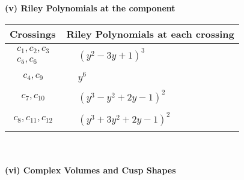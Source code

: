 \documentclass[1p]{elsarticle_modified}
\theoremstyle{definition}
\begin{document}
\newpage\renewcommand{\arraystretch}{1}
\flushleft \textbf{(v) Riley Polynomials at the component}\newline \\
\begin{tabular}{m{50pt}|m{274pt}}
Crossings & \hspace{64pt}Riley Polynomials at each crossing \\
\hline $$\begin{aligned}c_{1},c_{2},c_{3}\\c_{5},c_{6}\end{aligned}$$&$\begin{aligned}
&(y^2-3 y+1)^3
\end{aligned}$\\
\hline $$\begin{aligned}c_{4},c_{9}\end{aligned}$$&$\begin{aligned}
&y^6
\end{aligned}$\\
\hline $$\begin{aligned}c_{7},c_{10}\end{aligned}$$&$\begin{aligned}
&(y^3- y^2+2 y-1)^2
\end{aligned}$\\
\hline $$\begin{aligned}c_{8},c_{11},c_{12}\end{aligned}$$&$\begin{aligned}
&(y^3+3 y^2+2 y-1)^2
\end{aligned}$\\
\hline
\end{tabular}\\~\\
\newpage\flushleft \textbf{(vi) Complex Volumes and Cusp Shapes}
\end{document}
